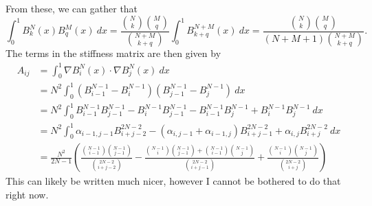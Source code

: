 \begin{solution}
    From these, we can gather that
    \begin{equation*}
        \int_{0}^{1} B_k^N(x) B_q^M(x) \ dx = \frac{\binom{N}{k}\binom{M}{q}}{\binom{N + M}{k + q}} \int_0^1 B_{k+q}^{N + M}(x) \ dx = \frac{\binom{N}{k}\binom{M}{q}}{(N + M + 1) \binom{N + M}{k + q}}.
    \end{equation*}
    The terms in the stiffness matrix are then given by
    \begin{align*}
        A_{ij} &= \int_{0}^{1} \nabla B_i^N(x) \cdot \nabla B_{j}^N(x) \ dx \\
        &= N^2 \int_{0}^{1} \left( B_{i-1}^{N - 1} - B_{i}^{N - 1} \right) \left( B_{j-1}^{N - 1} - B_{j}^{N - 1} \right) \ dx \\
        &= N^2
        \int_{0}^{1} B_{i-1}^{N - 1} B_{j-1}^{N - 1}
        - B_{i}^{N - 1} B_{j-1}^{N - 1}
        - B_{i-1}^{N - 1} B_{j}^{N - 1}
        + B_{i}^{N - 1} B_{j}^{N - 1} \ dx
        \\
        &= N^2 \int_{0}^{1} \alpha_{i-1, j-1} B_{i+j-2}^{2N-2} - (\alpha_{i,j-1} + \alpha_{i-1, j}) B_{i+j-1}^{2N - 2} + \alpha_{i,j} B_{i+j}^{2N - 2} \ dx \\
        &= \frac{N^2}{2N - 1} \left(
            \frac{\binom{N-1}{i-1}\binom{N-1}{j-1}}{\binom{2N - 2}{i + j - 2}}
            - \frac{
                \binom{N-1}{i}\binom{N-1}{j-1}
                + \binom{N-1}{i-1}\binom{N-1}{j}
            }{\binom{2N - 2}{i + j - 1}}
            + \frac{\binom{N-1}{i}\binom{N-1}{j}}{\binom{2N - 2}{i + j}}
        \right)
    \end{align*}
    This can likely be written much nicer, however I cannot be bothered to do that right now.
\end{solution}

